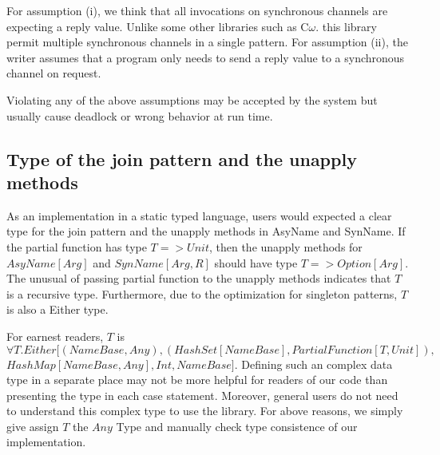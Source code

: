 For assumption (i), we think that all invocations on synchronous channels are expecting a reply value.  Unlike some other libraries such as C$\omega$. this library permit multiple synchronous channels in a single pattern.  For assumption (ii), the writer assumes that a program only needs to send a reply value to a synchronous channel on request.

Violating any of the above assumptions may be accepted by the system but usually cause deadlock or wrong behavior at run time.

\subsection{Type of the join pattern and the unapply methods}
As an implementation in a static typed language, users would expected a clear type for the join pattern and the unapply methods in AsyName and SynName.  If the partial function has type $T => Unit$, then the unapply methods for $AsyName[Arg]$ and $SynName[Arg, R]$ should have type $T => Option[Arg]$.  The unusual of passing partial function to the unapply methods indicates that $T$ is a recursive type.  Furthermore, due to the optimization for singleton patterns, $T$ is also a Either type.  

For earnest readers, $T$ is $\forall T.Either[(NameBase, Any), (HashSet[NameBase], PartialFunction[T, Unit]), $
$HashMap[NameBase, Any], Int, NameBase]$.  Defining such an complex data type in a separate place may not be more helpful for readers of our code than presenting the type in each case statement.  Moreover, general users do not need to understand this complex type to use the library.  For above reasons, we simply give assign $T$ the $Any$ Type and manually check type consistence of our implementation.

